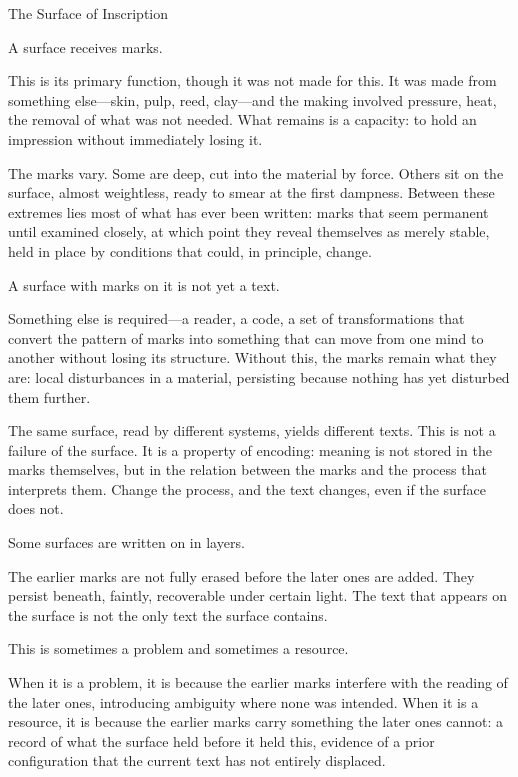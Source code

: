 
\begin{interlude}{The Surface of Inscription}

A surface receives marks.

This is its primary function, though it was not made for this. It
was made from something else---skin, pulp, reed, clay---and the
making involved pressure, heat, the removal of what was not needed.
What remains is a capacity: to hold an impression without
immediately losing it.

The marks vary. Some are deep, cut into the material by force.
Others sit on the surface, almost weightless, ready to smear at
the first dampness. Between these extremes lies most of what
has ever been written: marks that seem permanent until examined
closely, at which point they reveal themselves as merely stable,
held in place by conditions that could, in principle, change.

A surface with marks on it is not yet a text.

Something else is required---a reader, a code, a set of
transformations that convert the pattern of marks into something
that can move from one mind to another without losing its
structure. Without this, the marks remain what they are: local
disturbances in a material, persisting because nothing has yet
disturbed them further.

The same surface, read by different systems, yields different
texts. This is not a failure of the surface. It is a property of
encoding: meaning is not stored in the marks themselves, but in
the relation between the marks and the process that interprets
them. Change the process, and the text changes, even if the
surface does not.

\medskip

Some surfaces are written on in layers.

The earlier marks are not fully erased before the later ones are
added. They persist beneath, faintly, recoverable under certain
light. The text that appears on the surface is not the only text
the surface contains.

This is sometimes a problem and sometimes a resource.

When it is a problem, it is because the earlier marks interfere
with the reading of the later ones, introducing ambiguity where
none was intended. When it is a resource, it is because the
earlier marks carry something the later ones cannot: a record of
what the surface held before it held this, evidence of a prior
configuration that the current text has not entirely displaced.


\end{interlude}
